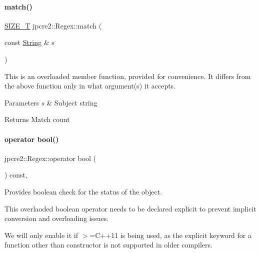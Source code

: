 \paragraph{\texorpdfstring{match()}{match()}\hspace{0.1cm}{\footnotesize\ttfamily [2/2]}}
{\footnotesize\ttfamily \hyperlink{namespacejpcre2_a2aac465ddcb123560c7c8215dd69246c}{S\+I\+Z\+E\+\_\+T} jpcre2\+::\+Regex\+::match (\begin{DoxyParamCaption}\item[{const \hyperlink{namespacejpcre2_a91f03070152fb228bc116c5a737f1d16}{String} \&}]{s }\end{DoxyParamCaption})\hspace{0.3cm}{\ttfamily [inline]}}



This is an overloaded member function, provided for convenience. It differs from the above function only in what argument(s) it accepts. 


\begin{DoxyParams}{Parameters}
{\em s} & Subject string \\
\hline
\end{DoxyParams}
\begin{DoxyReturn}{Returns}
Match count 
\end{DoxyReturn}
\hypertarget{classjpcre2_1_1Regex_a9070a9f3adcaebccca5d15b247b93fda_a9070a9f3adcaebccca5d15b247b93fda}{}\label{classjpcre2_1_1Regex_a9070a9f3adcaebccca5d15b247b93fda_a9070a9f3adcaebccca5d15b247b93fda} 
\paragraph{\texorpdfstring{operator bool()}{operator bool()}}
{\footnotesize\ttfamily jpcre2\+::\+Regex\+::operator bool (\begin{DoxyParamCaption}{ }\end{DoxyParamCaption}) const\hspace{0.3cm}{\ttfamily [inline]}, {\ttfamily [explicit]}}



Provides boolean check for the status of the object. 

This overlaoded boolean operator needs to be declared explicit to prevent implicit conversion and overloading issues.

We will only enable it if $>$=C++11 is being used, as the explicit keyword for a function other than constructor is not supported in older compilers.

